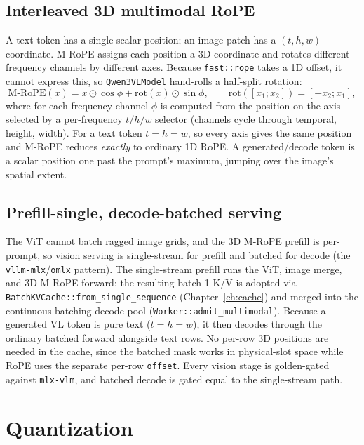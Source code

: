 \documentclass[11pt,a4paper]{report}
\newcommand{\code}[1]{\texttt{#1}}
\newcommand{\elemmul}{\odot}
\begin{document}
\section{Interleaved 3D multimodal RoPE}
A text token has a single scalar position; an image patch has a $(t, h, w)$
coordinate. M-RoPE assigns each position a 3D coordinate and rotates different
frequency channels by different axes. Because \code{fast::rope} takes a 1D offset, it
cannot express this, so \code{Qwen3VLModel} hand-rolls a half-split rotation:
\begin{equation}
  \text{M-RoPE}(x) = x \elemmul \cos\phi + \text{rot}(x)\elemmul \sin\phi,
  \qquad \text{rot}([x_1;x_2]) = [-x_2; x_1],
\end{equation}
where for each frequency channel $\phi$ is computed from the position on the axis
selected by a per-frequency $t/h/w$ selector (channels cycle through temporal,
height, width). For a text token $t=h=w$, so every axis gives the same
position and M-RoPE reduces \emph{exactly} to ordinary 1D RoPE. A generated/decode
token is a scalar position one past the prompt's maximum, jumping over the image's
spatial extent.

\section{Prefill-single, decode-batched serving}
The ViT cannot batch ragged image grids, and the 3D M-RoPE prefill is per-prompt, so
vision serving is single-stream for prefill and batched for decode (the
\code{vllm-mlx}/\code{omlx} pattern). The single-stream prefill runs the ViT, image
merge, and 3D-M-RoPE forward; the resulting batch-1 K/V is adopted via
\code{BatchKVCache::from\_single\_sequence} (Chapter~\ref{ch:cache}) and merged into
the continuous-batching decode pool (\code{Worker::admit\_multimodal}). Because a
generated VL token is pure text ($t=h=w$), it then decodes through the ordinary
batched forward alongside text rows. No per-row 3D positions are needed in the
cache, since the batched mask works in physical-slot space while RoPE uses the
separate per-row \code{offset}. Every vision stage is golden-gated against
\code{mlx-vlm}, and batched decode is gated equal to the single-stream path.

\chapter{Quantization}
\label{ch:quant}
\end{document}

